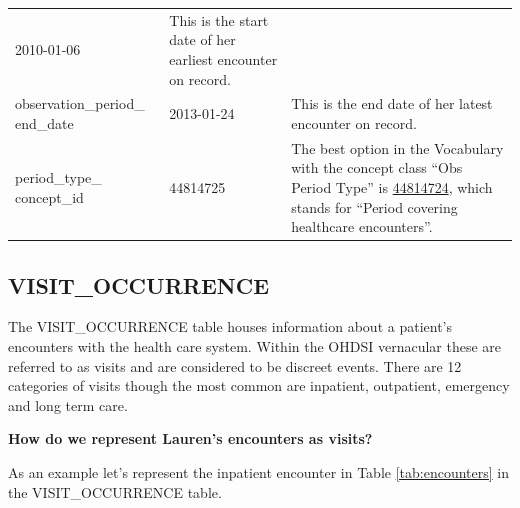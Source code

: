 \documentclass[11pt]{book}
\theoremstyle{definition}
\theoremstyle{definition}
\theoremstyle{definition}
\theoremstyle{remark}
\begin{document}
\begin{longtable}[]{@{}lll@{}}
\begin{minipage}[t]{0.15\columnwidth}
2010-01-06\strut
\end{minipage} & \begin{minipage}[t]{0.49\columnwidth}\raggedright
This is the start date of her earliest encounter on record.\strut
\end{minipage}\tabularnewline
\begin{minipage}[t]{0.28\columnwidth}\raggedright
observation\_period\_ end\_date\strut
\end{minipage} & \begin{minipage}[t]{0.15\columnwidth}\raggedright
2013-01-24\strut
\end{minipage} & \begin{minipage}[t]{0.49\columnwidth}\raggedright
This is the end date of her latest encounter on record.\strut
\end{minipage}\tabularnewline
\begin{minipage}[t]{0.28\columnwidth}\raggedright
period\_type\_ concept\_id\strut
\end{minipage} & \begin{minipage}[t]{0.15\columnwidth}\raggedright
44814725\strut
\end{minipage} & \begin{minipage}[t]{0.49\columnwidth}\raggedright
The best option in the Vocabulary with the concept class ``Obs Period Type'' is \href{http://athena.ohdsi.org/search-terms/terms/44814724}{44814724}, which stands for ``Period covering healthcare encounters''.\strut
\end{minipage}\tabularnewline
\bottomrule
\end{longtable}

\hypertarget{visitOccurrence}{%
\subsection{VISIT\_OCCURRENCE}\label{visitOccurrence}}

The VISIT\_OCCURRENCE table houses information about a patient's encounters with the health care system. Within the OHDSI vernacular these are referred to as visits and are considered to be discreet events. There are 12 categories of visits though the most common are inpatient, outpatient, emergency and long term care.

\textbf{How do we represent Lauren's encounters as visits?}

As an example let's represent the inpatient encounter in Table \ref{tab:encounters} in the VISIT\_OCCURRENCE table.
\end{document}
